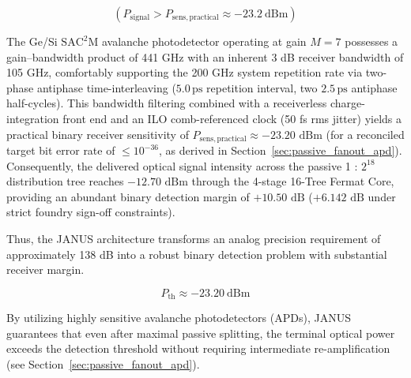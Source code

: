 \documentclass[journal]{IEEEtran}
\begin{document}
\begin{center}
\end{center}

\begin{equation}
\left(
P_{\mathrm{signal}} > P_{\mathrm{sens,practical}}
\approx -23.2~\mathrm{dBm}
\right)
\end{equation}

The Ge/Si $\mathrm{SAC^2M}$ avalanche photodetector operating at gain $M = 7$ possesses a gain--bandwidth product of 441 GHz with an inherent 3 dB receiver bandwidth of 105 GHz, comfortably supporting the 200 GHz system repetition rate via two-phase antiphase time-interleaving ($5.0\,\text{ps}$ repetition interval, two $2.5\,\text{ps}$ antiphase half-cycles). This bandwidth filtering combined with a receiverless charge-integration front end and an ILO comb-referenced clock (50 fs rms jitter) yields a practical binary receiver sensitivity of $P_{\mathrm{sens,practical}} \approx -23.20\text{ dBm}$ (for a reconciled target bit error rate of $\le 10^{-36}$, as derived in Section~\ref{sec:passive_fanout_apd}). Consequently, the delivered optical signal intensity across the passive 1 : $2^{18}$ distribution tree reaches $-12.70\text{ dBm}$ through the 4-stage 16-Tree Fermat Core, providing an abundant binary detection margin of $+10.50\text{ dB}$ ($+6.142\text{ dB}$ under strict foundry sign-off constraints).

Thus, the JANUS architecture transforms an analog precision requirement of approximately 138 dB into a robust binary detection problem with substantial receiver margin.

\begin{equation}
P_{\mathrm{th}} \approx -23.20~\mathrm{dBm}
\end{equation}

By utilizing highly sensitive avalanche photodetectors (APDs), JANUS guarantees that even after maximal passive splitting, the terminal optical power exceeds the detection threshold without requiring intermediate re-amplification (see Section~\ref{sec:passive_fanout_apd}).
\end{document}
